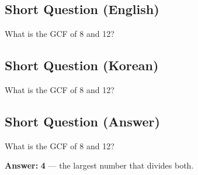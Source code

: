 \cleardoublepage
\subsection*{Short Question (English)}
What is the GCF of 8 and 12?


\newpage
\subsection*{Short Question (Korean)}
What is the GCF of 8 and 12?


\newpage
\subsection*{Short Question (Answer)}
What is the GCF of 8 and 12?

\textbf{Answer:} \textbf{4} — the largest number that divides both.
